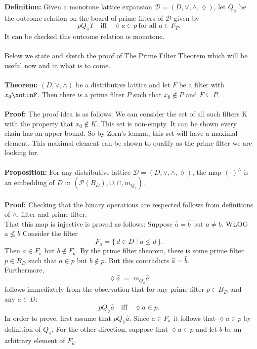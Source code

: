 \documentclass[12pt]{article}
\begin{document}
\textbf{Definition:}  
Given a monotone lattice expansion $\mathcal{D} = (D, \vee, \wedge, \lozenge)$,  
let $Q_{\lozenge}$ be the outcome relation on the board of prime filters of $\mathcal{D}$ given by
\[
p Q_{\lozenge} T \quad \text{iff} \quad \lozenge a \in p \ \text{for all } a \in F_{T}.
\]
It can be checked this outcome relation is monotone. \\ \\
Below we state and sketch the proof of The Prime Filter Theorem which will be useful now and in what is to come. \\ \\
\textbf{Theorem:} $(D,\vee,\wedge)$ be a distributive lattice and let $F$ be a filter with $x_0\notinF$. 
Then there is a prime filter $P$ such that $x_0\notin P$ and $F\subseteq P$.\\ \\
\textbf{Proof:} The proof idea is as follows: We can consider the set of all such filters K with the property that $x_0 \notin K $. This set is non-empty. It can be shown every chain has an upper bound. So by Zorn's lemma, this set will have a maximal element. This maximal element can be shown to qualify as the prime filter we are looking for. \\ \\
\textbf{Proposition:} For any distributive lattice $\mathcal{D}=(D, \vee, \wedge, \lozenge)$, the map $(\cdot)^{\wedge}$ is an embedding of $D$ in 
$(\mathcal{P}(B_D), \cup, \cap,m_{Q_{\lozenge}})$. \\ \\
\textbf{Proof:} Checking that the binary operations are respected follows from definitions of $\wedge$, filter and prime filter. \\
That this map is injective is proved as follows:  
Suppose $\widehat{a} = \widehat{b}$ but $a \neq b$. WLOG $a \nleq b$
Consider the filter 
\[
F_{a} = \{\, d \in D \mid a \leq d \,\}.
\]
Then $a \in F_{a}$ but $b \notin F_{a}$.  
By the prime filter theorem, there is some prime filter $p \in B_{D}$ such that  
$a \in p$ but $b \notin p$.  
But this contradicts $\widehat{a} = \widehat{b}$. \\
Furthermore, 
\[
\lozenge \widehat{a} \;=\; m_{Q_{\lozenge}} \widehat{a}
\]
follows immediately from the observation that for any prime filter $p \in B_{D}$ and any $a \in D$:  
\[
p Q_{\lozenge} \widehat{a} \quad \text{iff} \quad \lozenge a \in p.
\]
In order to prove, first assume that $p Q_{\lozenge} \widehat{a}$.  
Since $a \in F_{\widehat{a}}$ it follows that $\lozenge a \in p$ by definition of $Q_{\lozenge}$. For the other direction, suppose that $\lozenge a \in p$ and let $b$ be an arbitrary element of $F_{\widehat{a}}$.  
\end{document}
